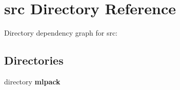 \section{src Directory Reference}
\label{dir_e0356a8e7b6cb1c36e1d7e67a04dd578}
Directory dependency graph for src\-:
\subsection*{Directories}
\begin{DoxyCompactItemize}
\item 
directory {\bf mlpack}
\end{DoxyCompactItemize}
